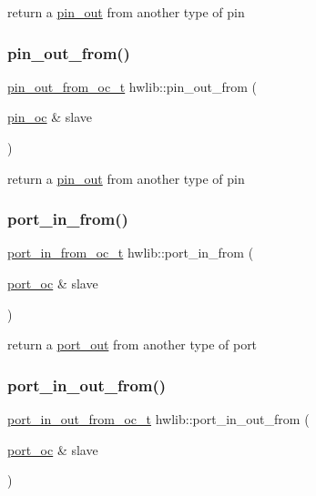 return a \hyperlink{classhwlib_1_1pin__out}{pin\+\_\+out} from another type of pin \mbox{\label{namespacehwlib_aa1e6aac16c5ac14715e165b463ec6a46}} 
\subsubsection{\texorpdfstring{pin\+\_\+out\+\_\+from()}{pin\_out\_from()}}
{\footnotesize\ttfamily \hyperlink{classhwlib_1_1pin__out__from__oc__t}{pin\+\_\+out\+\_\+from\+\_\+oc\+\_\+t} hwlib\+::pin\+\_\+out\+\_\+from (\begin{DoxyParamCaption}\item[{\hyperlink{classhwlib_1_1pin__oc}{pin\+\_\+oc} \&}]{slave }\end{DoxyParamCaption})}

return a \hyperlink{classhwlib_1_1pin__out}{pin\+\_\+out} from another type of pin \mbox{\label{namespacehwlib_a886e9f3e453056786f7329bfdc587d7b}} 
\subsubsection{\texorpdfstring{port\+\_\+in\+\_\+from()}{port\_in\_from()}}
{\footnotesize\ttfamily \hyperlink{classhwlib_1_1port__in__from__oc__t}{port\+\_\+in\+\_\+from\+\_\+oc\+\_\+t} hwlib\+::port\+\_\+in\+\_\+from (\begin{DoxyParamCaption}\item[{\hyperlink{classhwlib_1_1port__oc}{port\+\_\+oc} \&}]{slave }\end{DoxyParamCaption})}

return a \hyperlink{classhwlib_1_1port__out}{port\+\_\+out} from another type of port \mbox{\label{namespacehwlib_acbdd725ccffcd89167303457d733ecc0}} 
\subsubsection{\texorpdfstring{port\+\_\+in\+\_\+out\+\_\+from()}{port\_in\_out\_from()}\hspace{0.1cm}{\footnotesize\ttfamily [1/2]}}
{\footnotesize\ttfamily \hyperlink{classhwlib_1_1port__in__out__from__oc__t}{port\+\_\+in\+\_\+out\+\_\+from\+\_\+oc\+\_\+t} hwlib\+::port\+\_\+in\+\_\+out\+\_\+from (\begin{DoxyParamCaption}\item[{\hyperlink{classhwlib_1_1port__oc}{port\+\_\+oc} \&}]{slave }\end{DoxyParamCaption})}

